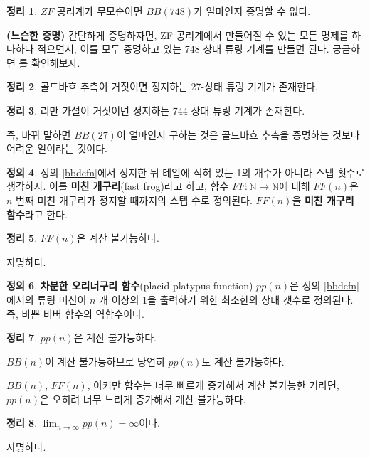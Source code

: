 \documentclass[b5paper, 11pt]{book}
\theoremstyle{definition}
\newtheorem{defn}{정의}[chapter]
\newtheorem{thm}[defn]{정리}
\newenvironment{pf*}{\pushQED{\qed}\pf}
{\popQED\endpf}
\begin{document}
\begin{thm}
    $ZF$ 공리계가 무모순이면 $BB(748)$가 얼마인지 증명할 수 없다.
\end{thm}
\begin{pf*}
    \textbf{(느슨한 증명)}
    간단하게 증명하자면, ZF 공리계에서 만들어질 수 있는 모든 명제를 하나하나 적으면서, 이를 모두 증명하고 있는 748-상태 튜링 기계를 만들면 된다. 궁금하면 \cite{yedidia2016relatively}를 확인해보자.
\end{pf*}
\begin{thm}
    골드바흐 추측이 거짓이면 정지하는 27-상태 튜링 기계가 존재한다.
\end{thm}
\begin{thm}
    리만 가설이 거짓이면 정지하는 744-상태 튜링 기계가 존재한다.
\end{thm}
즉, 바꿔 말하면 $BB(27)$이 얼마인지 구하는 것은 골드바흐 추측을 증명하는 것보다 어려운 일이라는 것이다.
\begin{defn}
    정의 \ref{bbdefn}에서 정지한 뒤 테입에 적혀 있는 1의 개수가 아니라 스텝 횟수로 생각하자. 이를 \textbf{미친 개구리}(fast frog)라고 하고, 함수 $FF: \mathbb{N} \rightarrow \mathbb{N}$에 대해 $FF(n)$은 $n$ 번째 미친 개구리가 정지할 때까지의 스텝 수로 정의된다. $FF(n)$을 \textbf{미친 개구리 함수}라고 한다.
\end{defn}
\begin{thm}
    $FF(n)$은 계산 불가능하다.
\end{thm}
\begin{pf*}
    자명하다.
\end{pf*}
\begin{defn}
    \textbf{차분한 오리너구리 함수}(placid platypus function) $pp(n)$은 정의 \ref{bbdefn}에서의 튜링 머신이 $n$ 개 이상의 1을 출력하기 위한 최소한의 상태 갯수로 정의된다. 즉, 바쁜 비버 함수의 역함수이다.
\end{defn}
\begin{thm}
    $pp(n)$은 계산 불가능하다.
\end{thm}
\begin{pf*}
    $BB(n)$이 계산 불가능하므로 당연히 $pp(n)$도 계산 불가능하다.
\end{pf*}
$BB(n)$, $FF(n)$, 아커만 함수는 너무 빠르게 증가해서 계산 불가능한 거라면, $pp(n)$은 오히려 너무 느리게 증가해서 계산 불가능하다.
\begin{thm}
    $\lim_{n\rightarrow\infty} pp(n) = \infty$이다.
\end{thm}
\begin{pf*}
    자명하다.
\end{pf*}
\end{document}
